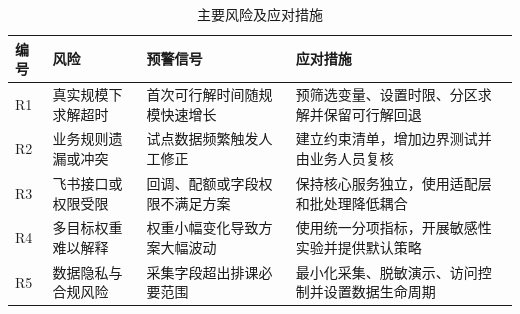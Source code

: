 \begin{table}[htbp]
  \centering
  \caption{主要风险及应对措施}
  \label{tab:risk-actions}
  \small
  \begin{tabularx}{\textwidth}{C{1.1cm} L{3.1cm} Y Y}
    \toprule
    \textbf{编号} & \textbf{风险} & \textbf{预警信号} & \textbf{应对措施} \\
    \midrule
    R1 & 真实规模下求解超时 & 首次可行解时间随规模快速增长 & 预筛选变量、设置时限、分区求解并保留可行解回退 \\
    R2 & 业务规则遗漏或冲突 & 试点数据频繁触发人工修正 & 建立约束清单，增加边界测试并由业务人员复核 \\
    R3 & 飞书接口或权限受限 & 回调、配额或字段权限不满足方案 & 保持核心服务独立，使用适配层和批处理降低耦合 \\
    R4 & 多目标权重难以解释 & 权重小幅变化导致方案大幅波动 & 使用统一分项指标，开展敏感性实验并提供默认策略 \\
    R5 & 数据隐私与合规风险 & 采集字段超出排课必要范围 & 最小化采集、脱敏演示、访问控制并设置数据生命周期 \\
    \bottomrule
  \end{tabularx}
\end{table}
